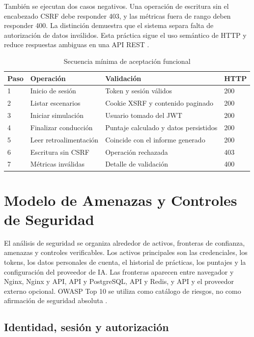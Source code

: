\documentclass[11pt,a4paper]{report}
\begin{document}
También se ejecutan dos casos negativos. Una operación de escritura sin el
encabezado CSRF debe responder 403, y las métricas fuera de rango deben responder
400. La distinción demuestra que el sistema separa falta de autorización de datos
inválidos. Esta práctica sigue el uso semántico de HTTP y reduce respuestas ambiguas
en una API REST \cite{fielding2000architectural}.

\begin{table}[htbp]
\centering
\caption{Secuencia mínima de aceptación funcional}
\begin{tabularx}{\textwidth}{p{1.1cm}p{4.2cm}X p{1.6cm}}
\toprule
\textbf{Paso} & \textbf{Operación} & \textbf{Validación} & \textbf{HTTP} \\
\midrule
1 & Inicio de sesión & Token y sesión válidos & 200 \\
2 & Listar escenarios & Cookie XSRF y contenido paginado & 200 \\
3 & Iniciar simulación & Usuario tomado del JWT & 200 \\
4 & Finalizar conducción & Puntaje calculado y datos persistidos & 200 \\
5 & Leer retroalimentación & Coincide con el informe generado & 200 \\
6 & Escritura sin CSRF & Operación rechazada & 403 \\
7 & Métricas inválidas & Detalle de validación & 400 \\
\bottomrule
\end{tabularx}
\end{table}

\chapter{Modelo de Amenazas y Controles de Seguridad}
\label{anexo:modelo-amenazas}

El análisis de seguridad se organiza alrededor de activos, fronteras de confianza,
amenazas y controles verificables. Los activos principales son las credenciales, los
tokens, los datos personales de cuenta, el historial de prácticas, los puntajes y la
configuración del proveedor de IA. Las fronteras aparecen entre navegador y Nginx,
Nginx y API, API y PostgreSQL, API y Redis, y API y el proveedor externo opcional.
OWASP Top 10 se utiliza como catálogo de riesgos, no como afirmación de seguridad
absoluta \cite{owasp2021}.

\section{Identidad, sesión y autorización}
\end{document}
